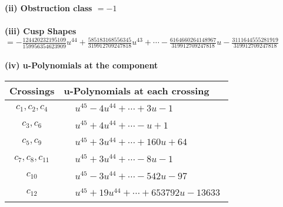 \documentclass[1p]{elsarticle_modified}
\theoremstyle{definition}
\begin{document}
\flushleft \textbf{(ii) Obstruction class $= -1$}\\~\\
\flushleft \textbf{(iii) Cusp Shapes $= -\frac{124420232195109}{159956354623909} u^{44}+\frac{585183168556345}{319912709247818} u^{43}+\cdots-\frac{6164660264148967}{319912709247818} u-\frac{3111644555281919}{319912709247818}$}\\~\\
\newpage\renewcommand{\arraystretch}{1}
\flushleft \textbf{(iv) u-Polynomials at the component}\newline \\
\begin{tabular}{m{50pt}|m{274pt}}
Crossings & \hspace{64pt}u-Polynomials at each crossing \\
\hline $$\begin{aligned}c_{1},c_{2},c_{4}\end{aligned}$$&$\begin{aligned}
&u^{45}-4 u^{44}+\cdots+3 u-1
\end{aligned}$\\
\hline $$\begin{aligned}c_{3},c_{6}\end{aligned}$$&$\begin{aligned}
&u^{45}+4 u^{44}+\cdots- u+1
\end{aligned}$\\
\hline $$\begin{aligned}c_{5},c_{9}\end{aligned}$$&$\begin{aligned}
&u^{45}+3 u^{44}+\cdots+160 u+64
\end{aligned}$\\
\hline $$\begin{aligned}c_{7},c_{8},c_{11}\end{aligned}$$&$\begin{aligned}
&u^{45}+3 u^{44}+\cdots-8 u-1
\end{aligned}$\\
\hline $$\begin{aligned}c_{10}\end{aligned}$$&$\begin{aligned}
&u^{45}-3 u^{44}+\cdots-542 u-97
\end{aligned}$\\
\hline $$\begin{aligned}c_{12}\end{aligned}$$&$\begin{aligned}
&u^{45}+19 u^{44}+\cdots+653792 u-13633
\end{aligned}$\\
\hline
\end{tabular}\\~\\
\end{document}
